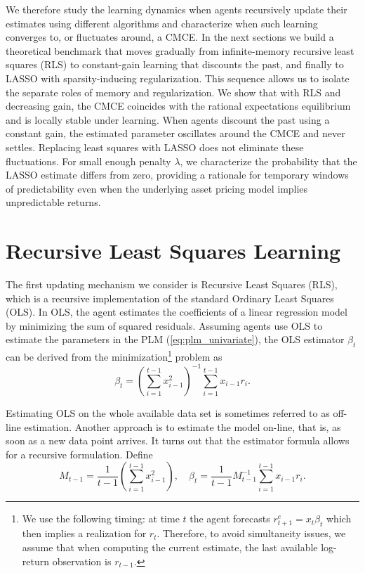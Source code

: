 \documentclass[11pt]{article}
\begin{document}
We therefore study the learning dynamics when agents recursively update their estimates using different algorithms and characterize when such learning converges to, or fluctuates around, a CMCE. In the next sections we build a theoretical benchmark that moves gradually from infinite-memory recursive least squares (RLS) to constant-gain learning that discounts the past, and finally to LASSO with sparsity-inducing regularization. This sequence allows us to isolate the separate roles of memory and regularization. We show that with RLS and decreasing gain, the CMCE coincides with the rational expectations equilibrium and is locally stable under learning. When agents discount the past using a constant gain, the estimated parameter oscillates around the CMCE and never settles. Replacing least squares with LASSO does not eliminate these fluctuations. For small enough penalty $\lambda$, we characterize the probability that the LASSO estimate differs from zero, providing a rationale for temporary windows of predictability even when the underlying asset pricing model implies unpredictable returns.

\section{Recursive Least Squares Learning}

The first updating mechanism we consider is Recursive Least Squares (RLS), which is a recursive implementation of the standard Ordinary Least Squares (OLS).
In OLS, the agent estimates the coefficients of a linear regression model by minimizing the sum of squared residuals.
Assuming agents use OLS to estimate the parameters in the PLM (\ref{eq:plm_univariate}), the OLS estimator $\beta_t$ can be derived from the minimization\footnote{
We use the following timing:
at time $t$ the agent forecasts $r^e_{t+1} = x_t \beta_{t}$ which then implies a realization for $r_t$. 
Therefore, to avoid simultaneity issues, we assume that when computing the current estimate, the last available log-return observation is $r_{t-1}$.
} problem as
\begin{equation}
     \beta_t = \left(\sum^{t-1}_{i=1}  x_{i-1}^2 \right)^{-1} \sum^{t-1}_{i=1}  x_{i-1} r_i.
\end{equation}

Estimating OLS on the whole available data set is sometimes referred to as off-line estimation. 
Another approach is to estimate the model on-line, that is, as soon as a new data point arrives. 
It turns out that the estimator formula allows for a recursive formulation.
Define 
\begin{equation}
M_{t-1} = \frac{1}{t-1}  \left(\sum^{t-1}_{i=1}  x_{i-1}^2 \right), \quad \beta_t = \frac{1}{t-1} M^{-1}_{t-1} \sum^{t-1}_{i=1}  x_{i-1} r_i.
\end{equation}
\end{document}
